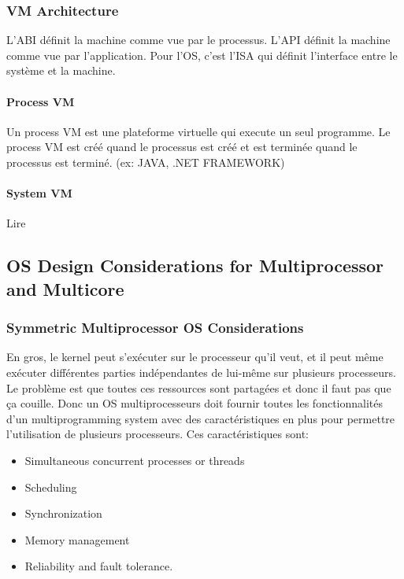 \subsubsection{VM Architecture}
L'ABI définit la machine comme vue par le processus.
L'API définit la machine comme vue par l'application.
Pour l'OS, c'est l'ISA qui définit l'interface entre le système et la machine.

\paragraph{Process VM}
Un process VM est une plateforme virtuelle qui execute un seul programme.
Le process VM est créé quand le processus est créé et est terminée quand le processus est terminé.
(ex: JAVA, .NET FRAMEWORK)

\paragraph{System VM}
Lire \cite[p.~96]{stallings}

\subsection{OS Design Considerations for Multiprocessor and Multicore}

\subsubsection{Symmetric Multiprocessor OS Considerations}
En gros, le kernel peut s'exécuter sur le processeur qu'il veut,
et il peut même exécuter différentes parties indépendantes de lui-même sur plusieurs processeurs.
Le problème est que toutes ces ressources sont partagées et donc il faut pas que ça couille.
Donc un OS multiprocesseurs doit fournir toutes les fonctionnalités d'un multiprogramming
system avec des caractéristiques en plus pour permettre l'utilisation de plusieurs processeurs.
Ces caractéristiques sont:
\begin{itemize}
  \item Simultaneous concurrent processes or threads
  \item Scheduling
  \item Synchronization
  \item Memory management
  \item Reliability and fault tolerance.
\end{itemize}

